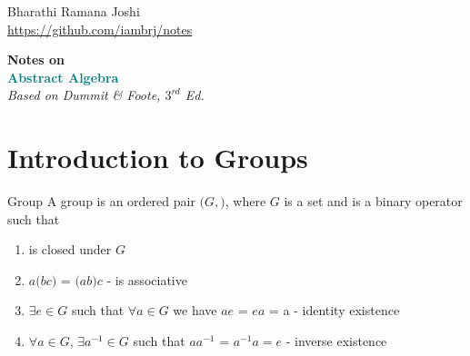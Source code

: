 \documentclass[titlepage, 12pt]{book}
\begin{document}
\begin{titlepage} %

	\raggedleft%

	\vspace*{\baselineskip} %

	{Bharathi Ramana Joshi\\\url{https://github.com/iambrj/notes}} %

	\vspace*{0.167\textheight} %

	\textbf{\LARGE Notes on}\\[\baselineskip] %

	\textbf{\textcolor{teal}{\huge Abstract Algebra}}\\[\baselineskip] %

    {\Large \textit{Based on Dummit \& Foote, $3^{rd}$ Ed.}} %

	\vfill %

	\vspace*{3\baselineskip} %

\end{titlepage}

\tableofcontents

\chapter{Introduction to Groups}
\begin{definition}{Group}{}
  A group is an ordered pair $(G,$$)$, where $G$ is a set and
     is a binary operator such that

    \begin{enumerate}

      \item {} is closed under $G$

      \item $a$$(b$$c)$ = $(a$$b)$$c$
        -  is associative

      \item $\exists e\in G$ such that $\forall a\in G$ we have
        $a$$e$ = $e$$a$ = a - identity existence

      \item $\forall a\in G$, $\exists a^{-1}\in G$ such that
        $a$$a^{-1}$ = $a^{-1}$$a = e$ - inverse
        existence

    \end{enumerate}
\end{definition}
\end{document}
